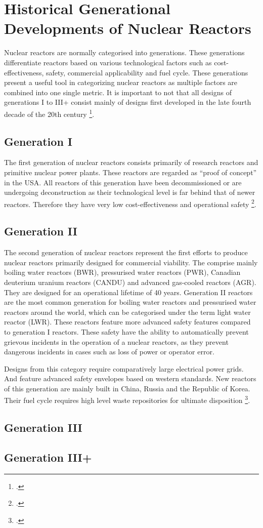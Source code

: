 \chapter{Historical Generational Developments of Nuclear Reactors}
Nuclear reactors are normally categorised into generations. These generations differentiate
reactors based on various technological factors such as cost-effectiveness, safety, commercial applicability and
fuel cycle. These generations present a useful tool in categorizing nuclear reactors as multiple factors
are combined into one single metric. It is important to not  that all designs of generations I
to III+ consist mainly of designs first developed in the late fourth decade of the 20th century \footcite[1,2]{Gen2gen}.
\section{Generation I}
The first generation of nuclear reactors consists primarily of research reactors and primitive nuclear
power plants. These reactors are regarded as \enquote{proof of concept} in the USA. All reactors of
this generation have been decommissioned or are undergoing deconstruction as their technological level
is far behind that of newer reactors. Therefore they have very low cost-effectiveness and operational
safety \footcite[3]{Gen2gen}.
\section{Generation II}
The second generation of nuclear reactors represent the first efforts to produce nuclear reactors primarily
designed for commercial viability. The comprise mainly boiling water reactors (BWR), pressurised water reactors (PWR),
Canadian deuterium uranium reactors (CANDU) and advanced gas-cooled reactors (AGR).  They are designed
for an operational lifetime of 40 years. Generation II reactors are the most common generation for boiling
water reactors and pressurised water reactors around the world, which can be categorised under the term
light water reactor (LWR). These reactors feature more advanced safety features compared to generation I
reactors. These safety have the ability to automatically prevent grievous incidents in the operation
of a nuclear reactors, as they prevent dangerous incidents in cases such as loss of power or operator
error.

Designs from this category require comparatively large electrical power grids. And feature advanced
safety envelopes based on western standards. New reactors of this generation are mainly built in
China, Russia and the Republic of Korea. Their fuel cycle requires high level waste repositories
for ultimate disposition \footcite[4-6]{Gen2gen}.
\section{Generation III}
\section{Generation III+}